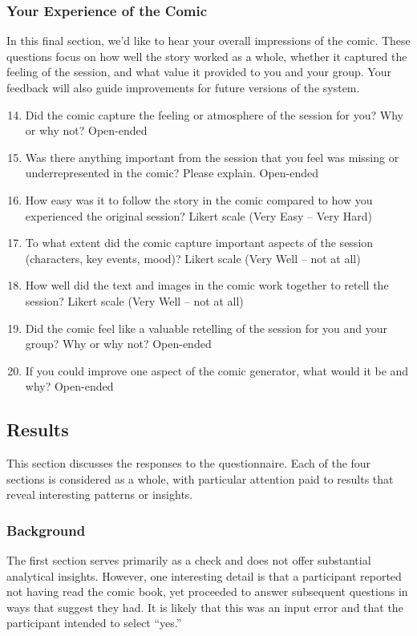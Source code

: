 \subsubsection*{Your Experience of the Comic}
In this final section, we’d like to hear your overall impressions of the comic. These questions focus on how well the story worked as a whole, whether it captured the feeling of the session, and what value it provided to you and your group. Your feedback will also guide improvements for future versions of the system.
\begin{enumerate}
    \setcounter{enumi}{13}
    \item Did the comic capture the feeling or atmosphere of the session for you? Why or why not? \hfill Open-ended
    \item Was there anything important from the session that you feel was missing or underrepresented in the comic? Please explain. \hfill Open-ended
    \item How easy was it to follow the story in the comic compared to how you experienced the original session? \hfill Likert scale (Very Easy -- Very Hard)
    \item To what extent did the comic capture important aspects of the session (characters, key events, mood)? \hfill Likert scale (Very Well -- not at all)
    \item How well did the text and images in the comic work together to retell the session? \hfill Likert scale (Very Well -- not at all)
    \item Did the comic feel like a valuable retelling of the session for you and your group? Why or why not? \hfill Open-ended 
    \item If you could improve one aspect of the comic generator, what would it be and why? \hfill Open-ended
\end{enumerate}

\subsection*{Results}
This section discusses the responses to the questionnaire. Each of the four sections is considered as a whole, with particular attention paid to results that reveal interesting patterns or insights.

\subsubsection*{Background}
The first section serves primarily as a check and does not offer substantial analytical insights. However, one interesting detail is that a participant reported not having read the comic book, yet proceeded to answer subsequent questions in ways that suggest they had. It is likely that this was an input error and that the participant intended to select “yes.”

